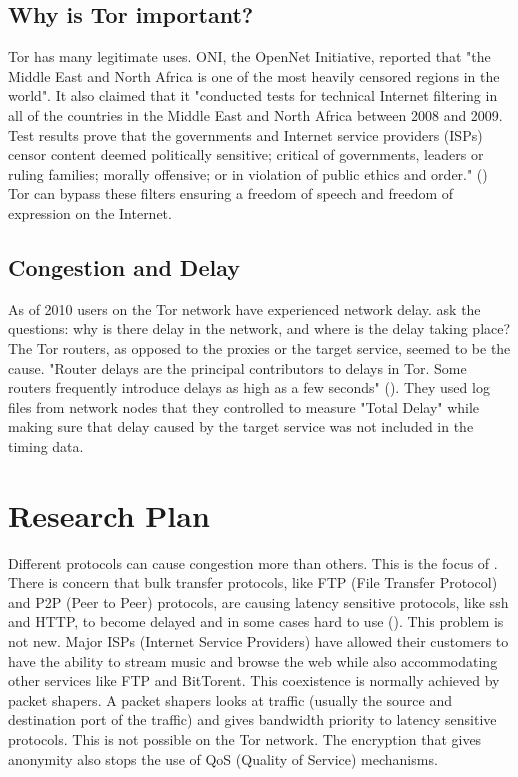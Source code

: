 \documentclass[letterpaper,12pt]{texMemo}
\begin{document}
    \subsection*{Why is Tor important?}
    Tor has many legitimate uses. ONI, the OpenNet Initiative, reported that "the Middle East and
    North Africa is one of the most heavily censored regions in the world". It also claimed that it
    "conducted tests for technical Internet filtering in all of the countries in the Middle East and
    North Africa between 2008 and 2009. Test results prove that the governments and Internet service
    providers (ISPs) censor content deemed politically sensitive; critical of governments, leaders
    or ruling families; morally offensive; or in violation of public ethics and order."
    (\citeauthor[6]{ONI}) Tor can bypass these filters ensuring a freedom of speech and freedom of
    expression on the Internet.

    \subsection*{Congestion and Delay}
    As of 2010 users on the Tor network have experienced network delay. \citeauthor[]{delay} ask the
    questions: why is there delay in the network, and where is the delay taking place? The Tor
    routers, as opposed to the proxies or the target service, seemed to be the cause. "Router delays
    are the principal contributors to delays in Tor. Some routers frequently introduce delays as
    high as a few seconds" (\citeauthor[3]{delay}). They used log files from network nodes that they
    controlled to measure "Total Delay" while making sure that delay caused by the target service was not
    included in the timing data.


\section*{Research Plan}

    Different protocols can cause congestion more than others. This is the focus of
    \citeauthor{analysis}. There is concern that bulk transfer protocols, like FTP (File Transfer
    Protocol) and P2P (Peer to Peer) protocols, are causing latency sensitive protocols, like ssh
    and HTTP, to become delayed and in some cases hard to use (\citeauthor[2]{analysis}). This
    problem is not new. Major ISPs (Internet Service Providers) have allowed their customers to have
    the ability to stream music and browse the web while also accommodating other services like FTP
    and BitTorent. This coexistence is normally achieved by packet shapers. A packet shapers looks
    at traffic (usually the source and destination port of the traffic) and gives bandwidth priority
    to latency sensitive protocols. This is not possible on the Tor network. The encryption that
    gives anonymity also stops the use of QoS (Quality of Service) mechanisms.
\end{document}
